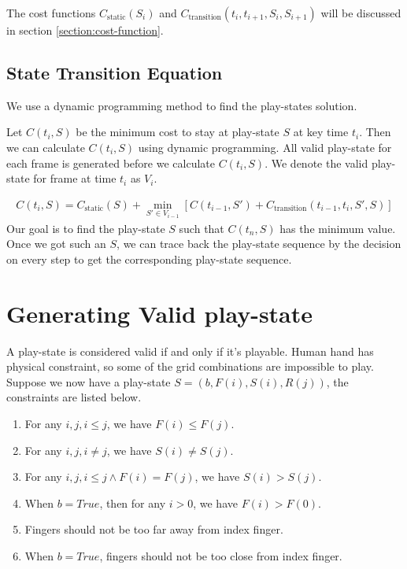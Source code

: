 The cost functions $C_{\mathrm{static}}(S_i)$ and $C_{\mathrm{transition}}(t_i, t_{i+1}, S_i, S_{i+1})$ will be discussed in section \ref{section:cost-function}.

\subsection{State Transition Equation}
We use a dynamic programming method to find the play-states solution. 

Let $C(t_i, S)$ be the minimum cost to stay at play-state $S$ at key time $t_i$. Then we can calculate $C(t_i, S)$ using dynamic programming.
All valid play-state for each frame is generated before we calculate $C(t_i, S)$.  We denote the valid play-state for frame at time $t_i$ as $V_i$.

\begin{eqnarray}
    C(t_i, S) = C_{\mathrm{static}}(S) +
        \min_{S' \in V_{i-1}} \left[
            C(t_{i-1}, S') + 
            C_{\mathrm{transition}}(t_{i-1}, t_i, S', S) 
        \right]
    \label{eqn:transition}
\end{eqnarray}
Our goal is to find the play-state $S$ such that $C(t_n, S)$ has the minimum value. Once we got such an $S$,  we can trace back the play-state sequence by the decision on every step to get the corresponding play-state sequence. 


\section{Generating Valid play-state}
A play-state is considered valid if and only if it's playable. Human hand has physical constraint, so some of the grid combinations are impossible to play. Suppose we now have a play-state $S=(b, F(i), S(i), R(j))$, the constraints are listed below.
\begin{enumerate}
    \item For any $i, j, i \le j$, we have $F(i) \le F(j)$.
    \item For any $i, j, i \neq j$, we have $S(i) \neq S(j)$.
    \item For any $i, j, i \le j \land F(i) = F(j)$, we have $S(i) > S(j)$.
    \item When $b = True$, then for any $i > 0$, we have $F(i) > F(0)$.
    \item Fingers should not be too far away from index finger.
    \item When $b = True$, fingers should not be too close from index finger.
\end{enumerate}

